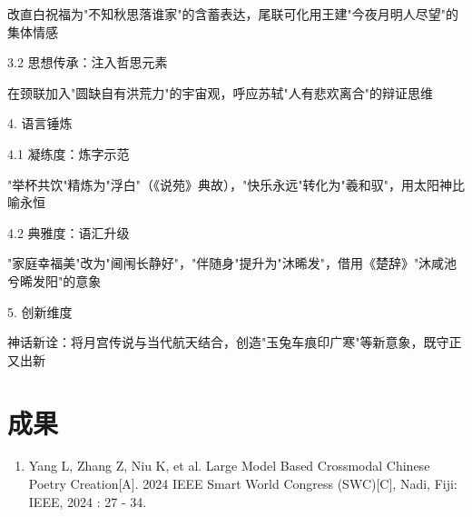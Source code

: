 \begin{tcolorbox}[
    breakable,            %
    colback=white, %
    colframe=black, 
    boxrule=1pt,        %
    arc=0mm             %
    ]
    \hspace{2em}改直白祝福为"不知秋思落谁家"的含蓄表达，尾联可化用王建"今夜月明人尽望"的集体情感\par
    \hspace{2em}3.2 思想传承：注入哲思元素\par
    \hspace{2em}在颈联加入"圆缺自有洪荒力"的宇宙观，呼应苏轼"人有悲欢离合"的辩证思维\par
    4. 语言锤炼\par
    \hspace{2em}4.1 凝练度：炼字示范\par
    \hspace{2em}"举杯共饮"精炼为"浮白"（《说苑》典故），"快乐永远"转化为"羲和驭"，用太阳神比喻永恒\par
    \hspace{2em}4.2 典雅度：语汇升级\par
    \hspace{2em}"家庭幸福美"改为"阃闱长静好"，"伴随身"提升为"沐晞发"，借用《楚辞》"沐咸池兮晞发阳"的意象\par
    5. 创新维度\par
    \hspace{2em}神话新诠：将月宫传说与当代航天结合，创造"玉兔车痕印广寒"等新意象，既守正又出新\par

\end{tcolorbox}



\chapter{成果}

\begin{enumerate}
    \item Yang L, Zhang Z, Niu K, et al. Large Model Based Crossmodal Chinese Poetry Creation[A]. 2024 IEEE Smart World Congress (SWC)[C], Nadi, Fiji: IEEE, 2024 : 27 - 34.
\end{enumerate}




